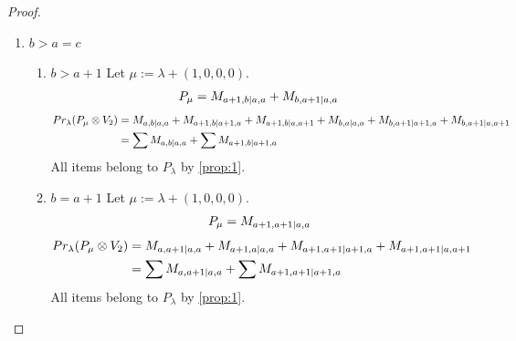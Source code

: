 \begin{proof}
\begin{enumerate}
\begin{enumerate}
\item $b=a+1$
        Let $\mu:=\lambda + (1,0,0,0) $. 
\begin{equation}\notag
  \begin{aligned}
      P_{\mu} =M_{a+1,a+1|c,a}
  \end{aligned}
\end{equation}
\begin{equation}\notag
  \begin{aligned}
  Pr_{\lambda}(P_\mu \otimes V_2) &=
M_{a,a+1|c,a}
+M_{a+1,a|c,a}
+M_{a+1,a+1|c,a+1}
                                  &=
\sum M_{a,a+1|c,a}
+ M_{a+1,a+1|c,a+1}
  \end{aligned}
\end{equation}
All items belong to $P_\lambda$ by \cref{prop:1}.
  \end{enumerate}
  
\item $b>a=c$
  \begin{enumerate}
    \item $b>a+1$
        Let $\mu:=\lambda + (1,0,0,0) $. 
\begin{equation}\notag
  \begin{aligned}
      P_{\mu} =M_{a+1,b|a,a}
+M_{b,a+1|a,a}
  \end{aligned}
\end{equation}
\begin{equation}\notag
  \begin{aligned}
  Pr_{\lambda}(P_\mu \otimes V_2) &=
M_{a,b|a,a}
+M_{a+1,b|a+1,a}
+M_{a+1,b|a,a+1}
+M_{b,a|a,a}
+M_{b,a+1|a+1,a}
+M_{b,a+1|a,a+1} \\
                                  &=
\sum M_{a,b|a,a}
+\sum M_{a+1,b|a+1,a}
  \end{aligned}
\end{equation}
All items belong to $P_\lambda$ by \cref{prop:1}.
    
\item $b=a+1$
        Let $\mu:=\lambda + (1,0,0,0) $. 
\begin{equation}\notag
  \begin{aligned}
      P_{\mu} =M_{a+1,a+1|a,a}
  \end{aligned}
\end{equation}
\begin{equation}\notag
  \begin{aligned}
  Pr_{\lambda}(P_\mu \otimes V_2) &=
M_{a,a+1|a,a}
+M_{a+1,a|a,a}
+M_{a+1,a+1|a+1,a}
+M_{a+1,a+1|a,a+1} \\
                                  &=
\sum M_{a,a+1|a,a}
+\sum M_{a+1,a+1|a+1,a}
  \end{aligned}
\end{equation}
All items belong to $P_\lambda$ by \cref{prop:1}.
  \end{enumerate}
  

\end{enumerate}
\end{proof}
